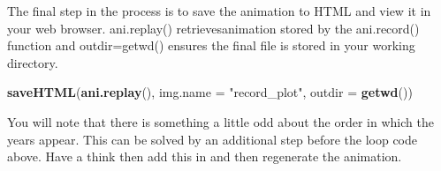 \documentclass[]{article}
\newenvironment{Shaded}{}{}
\newcommand{\KeywordTok}[1]{\textcolor[rgb]{0.00,0.44,0.13}{\textbf{{#1}}}}
\newcommand{\DataTypeTok}[1]{\textcolor[rgb]{0.56,0.13,0.00}{{#1}}}
\newcommand{\DecValTok}[1]{\textcolor[rgb]{0.25,0.63,0.44}{{#1}}}
\newcommand{\FloatTok}[1]{\textcolor[rgb]{0.25,0.63,0.44}{{#1}}}
\newcommand{\StringTok}[1]{\textcolor[rgb]{0.25,0.44,0.63}{{#1}}}
\newcommand{\NormalTok}[1]{{#1}}
\begin{document}
\begin{Shaded}
\end{Shaded}
The final step in the process is to save the animation to HTML and view
it in your web browser. ani.replay() retrievesanimation stored by the
ani.record() function and outdir=getwd() ensures the final file is
stored in your working directory.

\begin{Shaded}
\begin{Highlighting}[]
\KeywordTok{saveHTML}\NormalTok{(}\KeywordTok{ani.replay}\NormalTok{(), }\DataTypeTok{img.name =} \StringTok{"record_plot"}\NormalTok{, }\DataTypeTok{outdir =} \KeywordTok{getwd}\NormalTok{())}
\end{Highlighting}
\end{Shaded}
You will note that there is something a little odd about the order in
which the years appear. This can be solved by an additional step before
the loop code above. Have a think then add this in and then regenerate
the animation.
\end{document}
